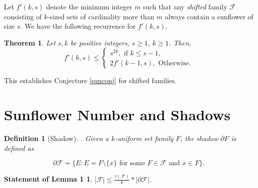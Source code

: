 \documentclass[runningheads,12pt,a4paper]{article}
\newtheorem{theorem}{Theorem}
\newtheorem{definition}{Definition}
\newtheorem*{statement1}{Statement of Lemma 1}
\begin{document}
	Let $f'(k,s)$ denote the minimum integer $m$ such that
	any \emph{shifted} family $\mathcal{F}$ consisting of $k$-sized sets of cardinality more than $m$ always contain a sunflower of size $s$. We have the following recurrence for $f'(k,s)$.
	
	\begin{theorem}\label{thm:shifted}
		Let $s,k$ be  positive integers, $s \geq 1$, $k \geq 1$. Then, $$f'(k,s) \leq \begin{cases}
			s^{2k}, \text{ if $k\le s-1$,}\\
			2f'(k-1,s), \text{ Otherwise.}
		\end{cases}$$
	\end{theorem}
	
	This establishes Conjecture \ref{sunconj} for shifted families.
	
	
	\section{Sunflower Number and Shadows}
	\label{sec:shadow}
	\begin{definition}[Shadow]. Given a $k$-uniform set family $F$, the shadow $\partial F$ is defined as
		
		\[\partial \mathcal F = \{E : E = F \setminus \{x\} \text{ for some } F \in \mathcal F \text{ and } x \in F\}.\]
		
	\end{definition}
	\begin{statement1}
		$|\mathcal F| \leq \frac{\tau(\mathcal F)}{k}*|\partial \mathcal F|$.
	\end{statement1} 
	
\end{document}
